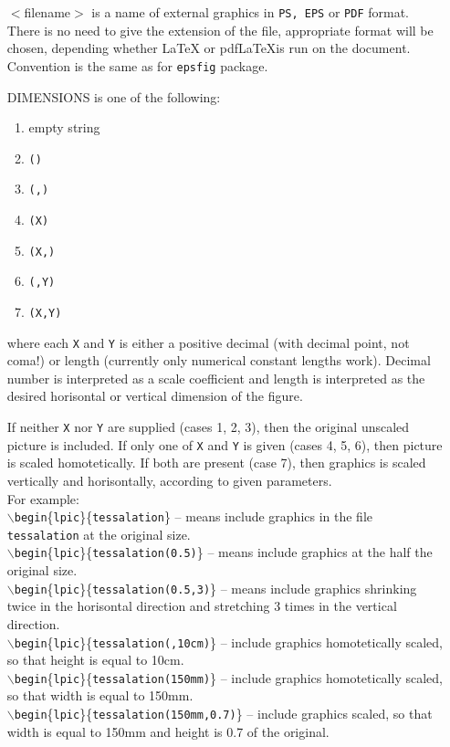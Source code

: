 \documentclass[10pt]{amsart}
\def\cmd#1{\texttt{$\backslash$#1}}
\let\latex=\LaTeX
\def\pdflatex{pdf\LaTeX}
\begin{document}
\begin{itemize}
\item[$<${\sc filename}$>$] is a name of external
  graphics in \texttt{PS, EPS} or \texttt{PDF} format.  There is no need
  to give the extension of the file, appropriate format will be
  chosen, depending whether \latex{} or \pdflatex is run on the
  document. Convention is the same as for \texttt{epsfig} package.
  \vspace{2mm}
\item[{\sc DIMENSIONS}] is one of the following:
  \begin{enumerate}
  \item empty string 
  \item \texttt{() }
  \item \texttt{(,) }
  \item \texttt{(X) }
  \item \texttt{(X,) }
  \item \texttt{(,Y) }
  \item \texttt{(X,Y) }
  \end{enumerate}
  where each \texttt{X} and \texttt{Y} is either a positive decimal (with
  decimal point, not coma!) or length (currently only numerical
  constant lengths work).  Decimal number is interpreted as a scale
  coefficient and length is interpreted as the desired horisontal or
  vertical dimension of the figure.
  
  If neither \texttt{X} nor \texttt{Y} are supplied (cases 1, 2, 3), then
  the original unscaled picture is included.  If only one of \texttt{X} and
  \texttt{Y} is given (cases 4, 5, 6), then picture is scaled
  homotetically.  If both are present (case 7), then graphics is
  scaled vertically and horisontally, according to given parameters.\\
  For example: \\
  \cmd{begin}\{\texttt{lpic}\}\{\texttt{tessalation}\} -- means include
  graphics in the file \texttt{tessalation} at the original size.\\
  \cmd{begin}\{\texttt{lpic}\}\{\texttt{tessalation(0.5)}\} -- means
  include graphics at the half the original size.\\
  \cmd{begin}\{\texttt{lpic}\}\{\texttt{tessalation(0.5,3)}\} -- means
  include graphics shrinking twice in the horisontal direction and
  stretching 3 times in the vertical direction.\\
  \cmd{begin}\{\texttt{lpic}\}\{\texttt{tessalation(,10cm)}\} -- include
  graphics homotetically scaled, so that height is equal to 10cm.\\
  \cmd{begin}\{\texttt{lpic}\}\{\texttt{tessalation(150mm)}\} -- include
  graphics homotetically scaled, so that width is equal to 150mm.\\
  \cmd{begin}\{\texttt{lpic}\}\{\texttt{tessalation(150mm,0.7)}\} --
  include graphics scaled, so that width is equal to 150mm and
  height is 0.7 of the original.


\end{itemize}
\end{document}
